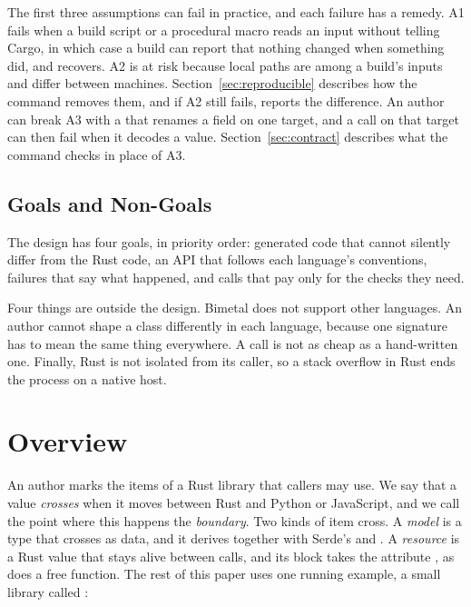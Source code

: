 \documentclass[sigconf,nonacm]{acmart}
\begin{document}
The first three assumptions can fail in practice, and each failure has a remedy. A1 fails when a build script or a procedural macro reads an input without telling Cargo, in which case a build can report that nothing changed when something did, and  recovers. A2 is at risk because local paths are among a build's inputs and differ between machines. Section~\ref{sec:reproducible} describes how the command removes them, and if A2 still fails,  reports the difference. An author can break A3 with a  that renames a field on one target, and a call on that target can then fail when it decodes a value. Section~\ref{sec:contract} describes what the command checks in place of A3.

\subsection{Goals and Non-Goals}

The design has four goals, in priority order: generated code that cannot silently differ from the Rust code, an API that follows each language's conventions, failures that say what happened, and calls that pay only for the checks they need.

Four things are outside the design. Bimetal does not support other languages. An author cannot shape a class differently in each language, because one signature has to mean the same thing everywhere. A call is not as cheap as a hand-written one. Finally, Rust is not isolated from its caller, so a stack overflow in Rust ends the process on a native host.

\section{Overview}
\label{sec:overview}

An author marks the items of a Rust library that callers may use. We say that a value \emph{crosses} when it moves between Rust and Python or JavaScript, and we call the point where this happens the \emph{boundary}. Two kinds of item cross. A \emph{model} is a type that crosses as data, and it derives  together with Serde's  and . A \emph{resource} is a Rust value that stays alive between calls, and its  block takes the attribute , as does a free function. The rest of this paper uses one running example, a small library called :
\end{document}

